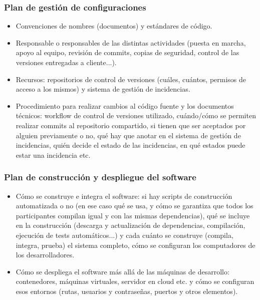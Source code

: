 \documentclass[12pt]{article}%
\begin{document}
\subsubsection{Plan de gesti\'on de configuraciones}
\begin{itemize}
	\item Convenciones de nombres (documentos) y est\'andares de c\'odigo.
	\item Responsable o responsables de las distintas actividades (puesta en marcha, apoyo al equipo, revisi\'on de commits, copias de seguridad, control de las versiones entregadas a cliente...).
	\item Recursos: repositorios de control de versiones (cu\'ales, cu\'antos, permisos de acceso a los mismos) y sistema de gesti\'on de incidencias.
	\item Procedimiento para realizar cambios al c\'odigo fuente y los documentos t\'ecnicos: workflow de control de versiones utilizado, cu\'ando/c\'omo se permiten realizar commits al repositorio compartido, si tienen que ser aceptados por alguien previamente o no, qu\'e hay que anotar en el sistema de gesti\'on de incidencias, qui\'en decide el estado de las incidencias, en qu\'e estados puede estar una incidencia etc.
\end{itemize}



\subsubsection{Plan de construcci\'on y despliegue del software}

\begin{itemize}
	\item C\'omo se construye e integra el software: si hay scripts de construcci\'on automatizada o no (en ese caso qu\'e se usa, y c\'omo se garantiza que todos los participantes compilan igual y con las mismas dependencias), qu\'e se incluye en la construcci\'on (descarga y actualizaci\'on de dependencias, compilaci\'on, ejecuci\'on de tests autom\'aticos...) y cada cu\'anto se construye (compila, integra, prueba) el sistema completo, c\'omo se configuran los computadores de los desarrolladores.
	\item C\'omo se despliega el software m\'as all\'a de las m\'aquinas de desarrollo: contenedores, m\'aquinas virtuales, servidor en cloud etc. y c\'omo se configuran esos entornos (rutas, usuarios y contrase\~nas, puertos y otros elementos).
\end{itemize}
\end{document}
